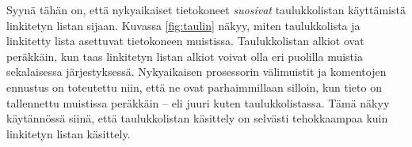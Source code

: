 Syynä tähän on, että nykyaikaiset tietokoneet
\emph{suosivat} taulukkolistan käyttämistä linkitetyn listan sijaan.
Kuvassa \ref{fig:taulin} näkyy, miten taulukkolista ja linkitetty lista
asettuvat tietokoneen muistissa.
Taulukkolistan alkiot ovat peräkkäin, kun taas linkitetyn
listan alkiot voivat olla eri puolilla muistia sekalaisessa
järjestyksessä.
Nykyaikaisen prosessorin välimuistit ja komentojen ennustus
on toteutettu niin, että ne ovat parhaimmillaan silloin,
kun tieto on tallennettu muistissa peräkkäin -- eli juuri kuten
taulukkolistassa.
Tämä näkyy käytännössä siinä, että taulukkolistan käsittely on selvästi
tehokkaampaa kuin linkitetyn listan käsittely.